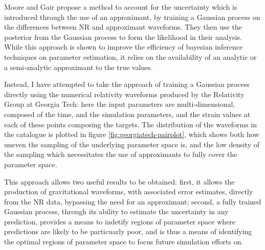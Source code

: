 \documentclass[openleft]{kentigern}
\theoremstyle{definition}
\begin{document}
Moore and Gair\cite{2014PhRvL.113y1101M,2016PhRvD..93f4001M} propose a
method to account for the uncertainty which is introduced through the
use of an approximant, by training a Gaussian process on the
differences between NR and approximant waveforms. They then use the
posterior from the Gaussian process to form the likelihood in their
analysis. While this approach is shown to improve the efficiency of
bayesian inference techniques on parameter estimation, it relies on
the availability of an analytic or a semi-analytic approximant to the
true values.


Instead, I have attempted to take the approach of training a Gaussian
process directly using the numerical relativity waveforms produced by
the Relativity Group at Georgia Tech\cite{gatechcat}: here the input
parameters are multi-dimensional, composed of the time, and the
simulation parameters, and the strain values at each of these points
composing the targets. The distribution of the waveforms in the
catalogue is plotted in figure \ref{fig:georgiatech-pairplot}, which
shows both how uneven the sampling of the underlying parameter space
is, and the low density of the sampling which necessitates the use of
approximants to fully cover the parameter space.

This approach allows two useful results to be obtained: first, it
allows the production of gravitational waveforms, with associated
error estimates, directly from the NR data, bypassing the need for an
approximant; second, a fully trained Gaussian process, through its
ability to estimate the uncertainty in any prediction, provides a
means to indetify regions of parameter space where predictions are
likely to be particuarly poor, and is thus a means of identifying the
optimal regions of parameter space to focus future simulation efforts
on.
\end{document}
